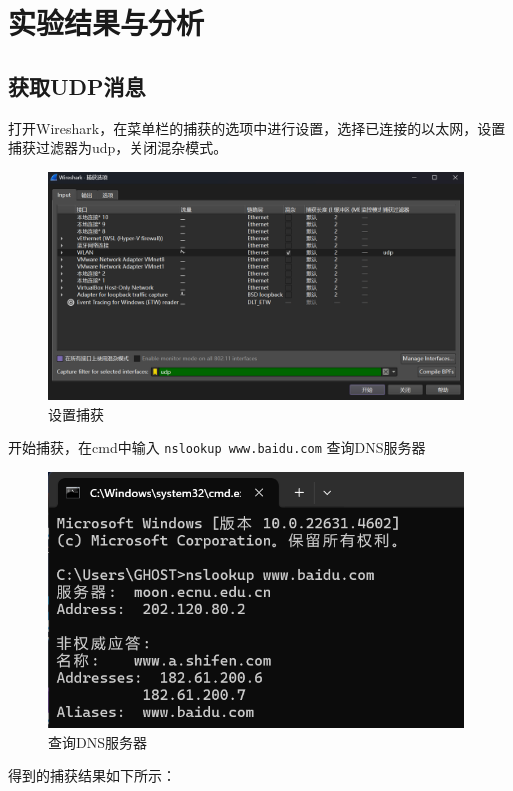 \documentclass{article}
\begin{document}
	\section{实验结果与分析}
	
	\subsection{获取UDP消息}
	
	打开Wireshark，在菜单栏的捕获的选项中进行设置，选择已连接的以太网，设置捕获过滤器为udp，关闭混杂模式。
	
	\begin{figure}[H]
		\centering
		\includegraphics[width=11cm]{images/1.设置捕获.png}
		\caption{设置捕获}
	\end{figure}
	
	开始捕获，在cmd中输入 \texttt{nslookup www.baidu.com} 查询DNS服务器
	
	\begin{figure}[H]
		\centering
		\includegraphics[width=11cm]{images/2.查询DNS服务器.png}
		\caption{查询DNS服务器}
	\end{figure}
	
	得到的捕获结果如下所示：
	
\end{document}

